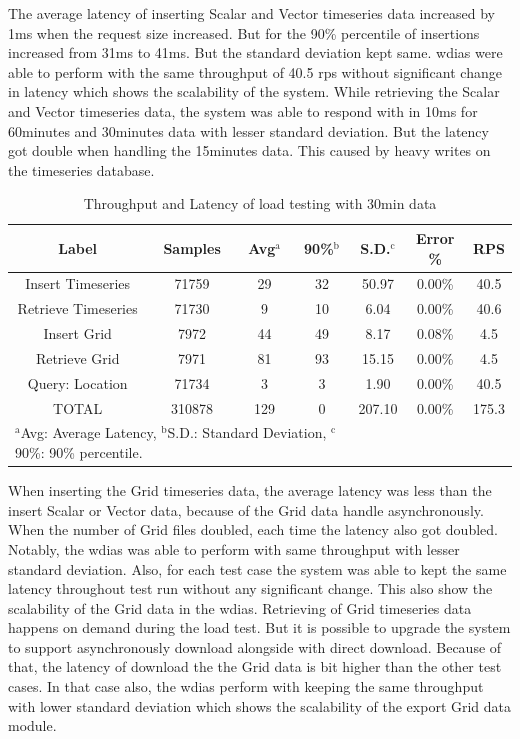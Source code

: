 \documentclass[conference]{IEEEtran}
\begin{document}
The average latency of inserting Scalar and Vector timeseries data increased by 1ms when the request size increased. But for the 90\% percentile of insertions increased from 31ms to 41ms. But the standard deviation kept same. \acrshort{wdias} were able to perform with the same throughput of 40.5 \acrshort{rps} without significant change in latency which shows the scalability of the system.
While retrieving the Scalar and Vector timeseries data, the system was able to respond with in 10ms for 60minutes and 30minutes data with lesser standard deviation. But the latency got double when handling the 15minutes data. This caused by heavy writes on the timeseries database.

\begin{table}[htbp]
\caption{ Throughput and Latency of load testing with 30min data}
\begin{center}
\begin{adjustbox}{width=0.45\textwidth}
\footnotesize
\begin{tabular}{|c|c|c|c|c|c|c|}
\hline
\textbf{Label} & \textbf{Samples} & \textbf{Avg$^{\mathrm{a}}$} & \textbf{90\%$^{\mathrm{b}}$} & \textbf{S.D.$^{\mathrm{c}}$} & \textbf{Error \%} & \textbf{RPS} \\ \hline
Insert Timeseries & 71759 & 29 & 32 & 50.97 & 0.00\% & 40.5 \\ \hline
Retrieve Timeseries & 71730 & 9 & 10 & 6.04 & 0.00\% & 40.6 \\ \hline
Insert Grid & 7972 & 44 & 49 & 8.17 & 0.08\% & 4.5 \\ \hline
Retrieve Grid & 7971 & 81 & 93 & 15.15 & 0.00\% & 4.5 \\ \hline
Query: Location & 71734 & 3 & 3 & 1.90 & 0.00\% & 40.5 \\ \hline
TOTAL & 310878 & 129 & 0 & 207.10 & 0.00\% & 175.3 \\ \hline
\multicolumn{4}{l}{$^{\mathrm{a}}$Avg: Average Latency, $^{\mathrm{b}}$S.D.: Standard Deviation, $^{\mathrm{c}}$90\%: 90\% percentile.}
\end{tabular}
\end{adjustbox}
\label{ptab:obs_all_30_min_summary_throughput}
\end{center}
\end{table}

When inserting the Grid timeseries data, the average latency was less than the insert Scalar or Vector data, because of the Grid data handle asynchronously. When the number of Grid files doubled, each time the latency also got doubled. Notably, the \acrshort{wdias} was able to perform with same throughput with lesser standard deviation. Also, for each test case the system was able to kept the same latency throughout test run without any significant change. This also show the scalability of the Grid data in the \acrshort{wdias}.
Retrieving of Grid timeseries data happens on demand during the load test. But it is possible to upgrade the system to support asynchronously download alongside with direct download. Because of that, the latency of download the the Grid data is bit higher than the other test cases. In that case also, the \acrshort{wdias} perform with keeping the same throughput with lower standard deviation which shows the scalability of the export Grid data module.
\end{document}
